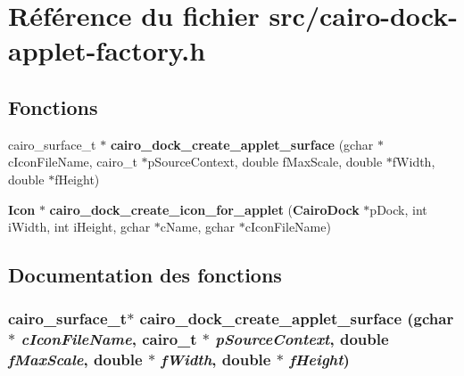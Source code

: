 \section{Référence du fichier src/cairo-dock-applet-factory.h}
\label{cairo-dock-applet-factory_8h}
\subsection*{Fonctions}
\begin{CompactItemize}
\item 
cairo\_\-surface\_\-t $\ast$ {\bf cairo\_\-dock\_\-create\_\-applet\_\-surface} (gchar $\ast$cIconFileName, cairo\_\-t $\ast$pSourceContext, double fMaxScale, double $\ast$fWidth, double $\ast$fHeight)
\item 
{\bf Icon} $\ast$ {\bf cairo\_\-dock\_\-create\_\-icon\_\-for\_\-applet} ({\bf CairoDock} $\ast$pDock, int iWidth, int iHeight, gchar $\ast$cName, gchar $\ast$cIconFileName)
\end{CompactItemize}


\subsection{Documentation des fonctions}
\subsubsection{\setlength{\rightskip}{0pt plus 5cm}cairo\_\-surface\_\-t$\ast$ cairo\_\-dock\_\-create\_\-applet\_\-surface (gchar $\ast$ {\em cIconFileName}, cairo\_\-t $\ast$ {\em pSourceContext}, double {\em fMaxScale}, double $\ast$ {\em fWidth}, double $\ast$ {\em fHeight})}\label{cairo-dock-applet-factory_8h_e6f070123dab179309fda57b26c19f08}


